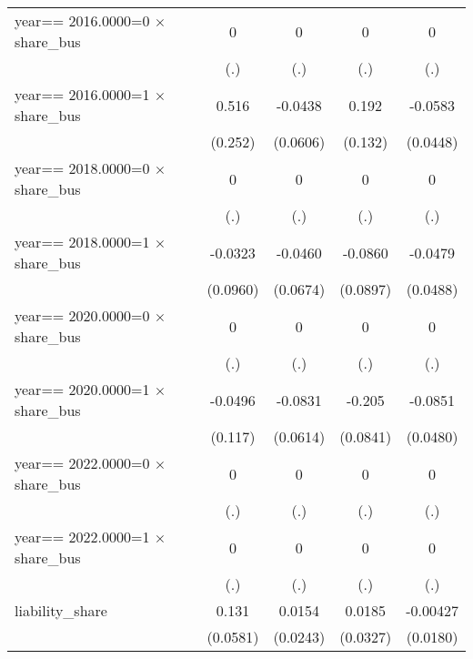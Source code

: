\begin{table}[htbp]
\begin{tabular}{l*{4}{c}}
year==  2016.0000=0 $\times$ share\_bus&        0         &        0         &        0         &        0         \\
                &      (.)         &      (.)         &      (.)         &      (.)         \\
year==  2016.0000=1 $\times$ share\_bus&    0.516\sym{**} &  -0.0438         &    0.192         &  -0.0583         \\
                &  (0.252)         & (0.0606)         &  (0.132)         & (0.0448)         \\
year==  2018.0000=0 $\times$ share\_bus&        0         &        0         &        0         &        0         \\
                &      (.)         &      (.)         &      (.)         &      (.)         \\
year==  2018.0000=1 $\times$ share\_bus&  -0.0323         &  -0.0460         &  -0.0860         &  -0.0479         \\
                & (0.0960)         & (0.0674)         & (0.0897)         & (0.0488)         \\
year==  2020.0000=0 $\times$ share\_bus&        0         &        0         &        0         &        0         \\
                &      (.)         &      (.)         &      (.)         &      (.)         \\
year==  2020.0000=1 $\times$ share\_bus&  -0.0496         &  -0.0831         &   -0.205\sym{**} &  -0.0851\sym{*}  \\
                &  (0.117)         & (0.0614)         & (0.0841)         & (0.0480)         \\
year==  2022.0000=0 $\times$ share\_bus&        0         &        0         &        0         &        0         \\
                &      (.)         &      (.)         &      (.)         &      (.)         \\
year==  2022.0000=1 $\times$ share\_bus&        0         &        0         &        0         &        0         \\
                &      (.)         &      (.)         &      (.)         &      (.)         \\
liability\_share &    0.131\sym{**} &   0.0154         &   0.0185         & -0.00427         \\
                & (0.0581)         & (0.0243)         & (0.0327)         & (0.0180)         \\

\end{tabular}
\end{table}
